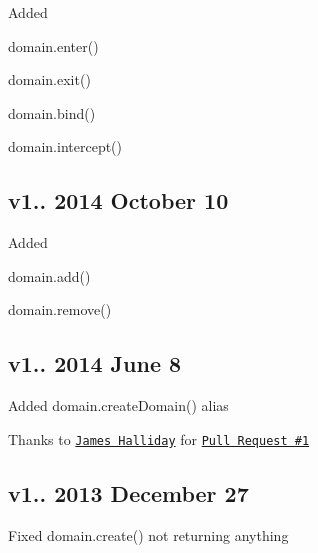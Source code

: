 \begin{DoxyItemize}
\item Added
\begin{DoxyItemize}
\item {\ttfamily domain.\+enter()}
\item {\ttfamily domain.\+exit()}
\item {\ttfamily domain.\+bind()}
\item {\ttfamily domain.\+intercept()}
\end{DoxyItemize}
\end{DoxyItemize}

\subsection*{v1.. 2014 October 10}


\begin{DoxyItemize}
\item Added
\begin{DoxyItemize}
\item {\ttfamily domain.\+add()}
\item {\ttfamily domain.\+remove()}
\end{DoxyItemize}
\end{DoxyItemize}

\subsection*{v1.. 2014 June 8}


\begin{DoxyItemize}
\item Added {\ttfamily domain.\+create\+Domain()} alias
\begin{DoxyItemize}
\item Thanks to \href{https://github.com/substack}{\tt James Halliday} for \href{https://github.com/bevry/domain-browser/pull/1}{\tt Pull Request \#1}
\end{DoxyItemize}
\end{DoxyItemize}

\subsection*{v1.. 2013 December 27}


\begin{DoxyItemize}
\item Fixed {\ttfamily domain.\+create()} not returning anything
\end{DoxyItemize}

